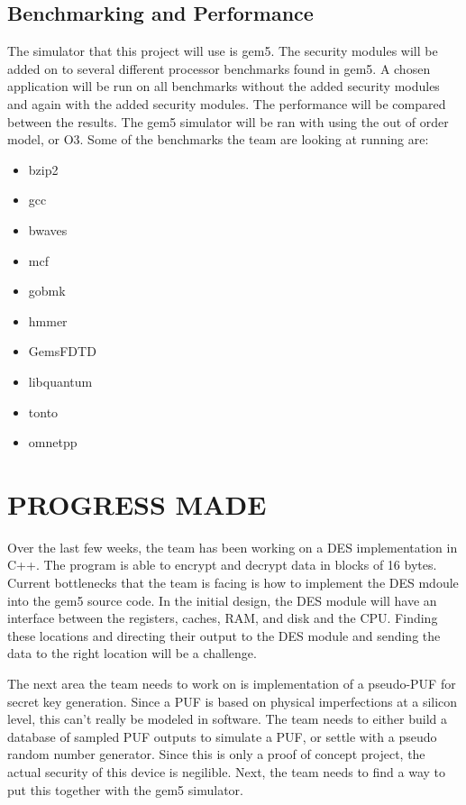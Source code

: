 \documentclass[letterpaper, 10 pt, conference]{ieeeconf}  %
\begin{document}
\subsection{Benchmarking and Performance}

The simulator that this project will use is gem5. The security modules will be added on to several different processor benchmarks found in gem5. A chosen application will be run on all benchmarks without the added security modules and again with the added security modules. The performance will be compared between the results. The gem5 simulator will be ran with using the out of order model, or O3. Some of the benchmarks the team are looking at running are:

\begin{multicols}{2}
\begin{itemize}
\item bzip2
\item gcc
\item bwaves
\item mcf
\item gobmk
\item hmmer
\item GemsFDTD
\item libquantum
\item tonto
\item omnetpp
\end{itemize}
\end{multicols}

\section{PROGRESS MADE}

Over the last few weeks, the team has been working on a DES implementation in C++. The program is able to encrypt and decrypt data in blocks of 16 bytes. Current bottlenecks that the team is facing is how to implement the DES mdoule into the gem5 source code. In the initial design, the DES module will have an interface between the registers, caches, RAM, and disk and the CPU. Finding these locations and directing their output to the DES module and sending the data to the right location will be a challenge. 

The next area the team needs to work on is implementation of a pseudo-PUF for secret key generation. Since a PUF is based on physical imperfections at a silicon level, this can't really be modeled in software. The team needs to either build a database of sampled PUF outputs to simulate a PUF, or settle with a pseudo random number generator. Since this is only a proof of concept project, the actual security of this device is negilible. Next, the team needs to find a way to put
this together with the gem5 simulator. 
\end{document}
